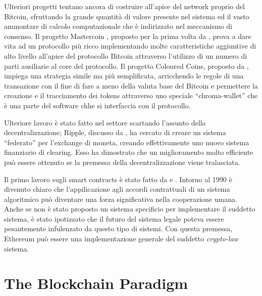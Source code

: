 \documentclass[9pt,oneside]{amsart}
\begin{document}
\begin{multicols}{2}
Ulteriori progetti tentano ancora di costruire all'apice del network proprio del Bitcoin, sfruttando la grande quantità di valore presente nel sistema ed il vasto ammontare di calcolo computazionale che è indirizzato nel meccanismo di consenso. Il progetto Mastercoin , proposto per la prima volta da \cite{mastercoin2013willett}, prova a dare vita ad un protocollo più ricco implementando molte caratteristiche aggiuntive di alto livello all'apice del protocollo Bitcoin attraverso l'utilizzo di un numero di parti ausiliarie al core del protocollo. Il progetto Coloured Coins, proposto da \cite{colouredcoins2012rosenfeld}, impiega una strategia simile ma più semplificata, arricchendo le regole di una transazione con il fine di fare a meno della valuta base del Bitcoin e permettere la creazione e il tracciamento dei tokens attraverso uno speciale ``chroma-wallet'' che è una parte del software chhe si interfaccia con il protocollo.

Ulteriore lavoro è stato fatto nel settore scartando l'assunto della decentralizzazione; Ripple, discusso da \cite{boutellier2014pirates}, ha cercato di creare un sistema ``federato'' per l'exchange di moneta, creando effettivamente uno nuovo sistema finanziario di clearing. Esso ha dimostrato che un miglioramento molto efficiente può essere ottenuto se la premessa della decentralizzazione viene tralasciata.

Il primo lavoro sugli smart contracts è stato fatto da \cite{szabo1997formalizing} e \cite{miller1997future}. Intorno al 1990 è divenuto chiaro che l'appilicazione agli accordi contrattuali di un sistema algoritmico può diventare una forza significativa nella cooperazione umana. Anche se non è stato proposto un sistema specificio per implementare il suddetto sistema, è stato ipotizzato che il futuro del sistema legale poteva essere pesantemente infulenzato da questo tipo di sistemi. Con questa premessa, Ethereum può essere una implementazione generale del suddetto \textit{crypto-law} sistema.


\section{The Blockchain Paradigm} \label{ch:overview}


\end{multicols}
\end{document}
